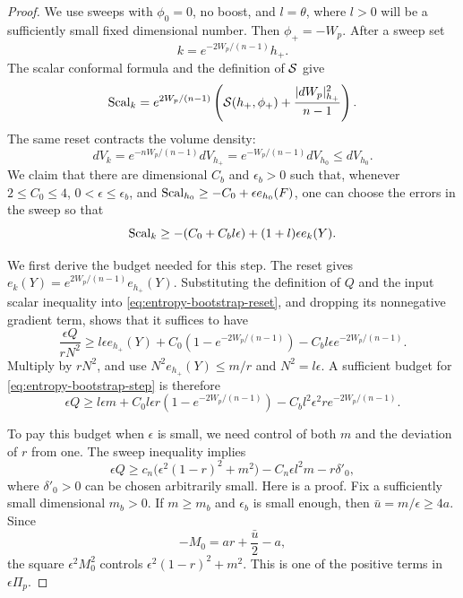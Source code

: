 \begin{proof}
We use sweeps with \(\phi_0=0\), no boost, and \(l=\theta\), where \(l>0\)
will be a sufficiently small fixed dimensional number.  Then
\(\phi_+=-W_p\).  After a sweep set
\[
 k=e^{-2W_p/(n-1)}h_+ .
\]
The scalar conformal formula and the definition of \(\mathcal S\) give
\begin{equation}\label{eq:entropy-bootstrap-reset}
 \operatorname{Scal}_k=e^{2W_p/(n-1)}
 \left(\mathcal S(h_+,\phi_+)+\frac{|dW_p|_{h_+}^2}{n-1}\right).
\end{equation}
The same reset contracts the volume density:
\begin{equation}\label{eq:entropy-bootstrap-density}
 dV_k=e^{-nW_p/(n-1)}dV_{h_+}
      =e^{-W_p/(n-1)}dV_{h_0}\leq dV_{h_0}.
\end{equation}
We claim that there are dimensional \(C_b\) and \(\epsilon_b>0\) such
that, whenever \(2\leq C_0\leq4\), \(0<\epsilon\leq\epsilon_b\), and
\(\operatorname{Scal}_{h_0}\geq-C_0+\epsilon e_{h_0}(F)\), one can choose the errors
in the sweep so that
\begin{equation}\label{eq:entropy-bootstrap-step}
 \operatorname{Scal}_k\geq-(C_0+C_b l\epsilon)+(1+l)\epsilon e_k(Y).
\end{equation}

We first derive the budget needed for this step.  The reset gives
\(e_k(Y)=e^{2W_p/(n-1)}e_{h_+}(Y)\).  Substituting the definition of
\(Q\) and the input scalar inequality into
\eqref{eq:entropy-bootstrap-reset}, and dropping its nonnegative
gradient term, shows that it suffices to have
\[
 \frac{\epsilon Q}{rN^2}\geq
 l\epsilon e_{h_+}(Y)+C_0(1-e^{-2W_p/(n-1)})
       -C_b l\epsilon e^{-2W_p/(n-1)}.
\]
Multiply by \(rN^2\), and use
\(N^2 e_{h_+}(Y)\leq m/r\) and \(N^2=l\epsilon\).  A sufficient budget
for \eqref{eq:entropy-bootstrap-step} is therefore
\begin{equation}\label{eq:entropy-bootstrap-budget}
 \epsilon Q\geq
 l\epsilon m+C_0l\epsilon r(1-e^{-2W_p/(n-1)})
       -C_b l^2\epsilon^2r e^{-2W_p/(n-1)}.
\end{equation}

To pay this budget when \(\epsilon\) is small, we need control of both
\(m\) and the deviation of \(r\) from one.  The sweep inequality implies
\begin{equation}\label{eq:entropy-bootstrap-coercivity}
 \epsilon Q\geq
 c_n\bigl(\epsilon^2(1-r)^2+m^2\bigr)
       -C_n\epsilon l^2m-r\delta'_0 ,
\end{equation}
where \(\delta'_0>0\) can be chosen arbitrarily small.  Here is a proof.
Fix a sufficiently small dimensional \(m_b>0\).  If \(m\geq m_b\) and
\(\epsilon_b\) is small enough, then \(\bar u=m/\epsilon\geq4a\).  Since
\[
 -M_0=ar+\frac{\bar u}{2}-a,
\]
the square \(\epsilon^2M_0^2\) controls
\(\epsilon^2(1-r)^2+m^2\).  This is one of the positive terms in
\(\epsilon\Pi_p\).


\end{proof}
